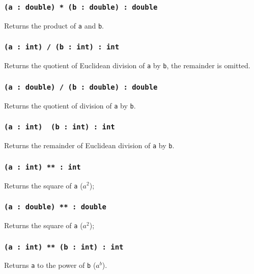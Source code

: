 \subsubsection{\texttt{(a : double) * (b : double) : double}}

Returns the product of \texttt{a} and \texttt{b}.

\subsubsection{\texttt{(a : int) / (b : int) : int}}

Returns the quotient of Euclidean division of \texttt{a} by \texttt{b}, the remainder is omitted.

\subsubsection{\texttt{(a : double) / (b : double) : double}}

Returns the quotient of division of \texttt{a} by \texttt{b}.

\subsubsection{\texttt{(a : int) \ (b : int) : int}}

Returns the remainder of Euclidean division of \texttt{a} by \texttt{b}.


\subsubsection{\texttt{(a : int) ** : int}}

Returns the square of \texttt{a} ($a^2$);

\subsubsection{\texttt{(a : double) ** : double}}

Returns the square of \texttt{a} ($a^2$);

\subsubsection{\texttt{(a : int) ** (b : int) : int}}

Returns \texttt{a} to the power of \texttt{b} ($a^b$).

